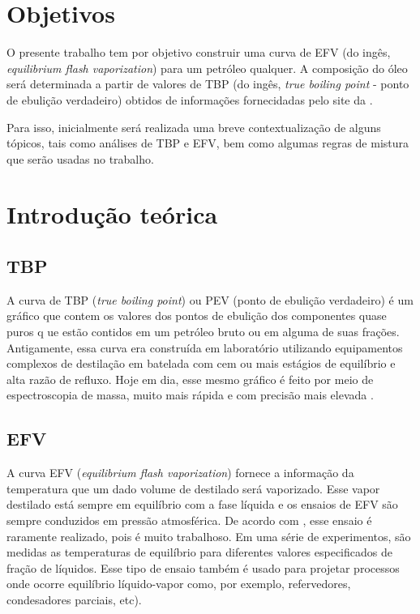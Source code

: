 \section{Objetivos}
O presente trabalho tem por objetivo construir uma curva de EFV (do
ingês, \emph{equilibrium flash vaporization}) para um petróleo qualquer. A
composição do óleo será determinada a partir de valores de TBP (do ingês,
\emph{true boiling point} - ponto de ebulição verdadeiro) obtidos de
informações fornecidadas pelo site da \citeauthor{TOTSA2016}.

Para isso, inicialmente será realizada uma breve contextualização de alguns
tópicos, tais como análises de TBP e EFV, bem como algumas regras de mistura
que serão usadas no trabalho.

\section{Introdução teórica}

\subsection{TBP}
A curva de TBP (\emph{true boiling point}) ou PEV (ponto de ebulição verdadeiro)
é um gráfico que contem os valores dos pontos de ebulição  dos componentes quase puros q
ue estão contidos em um petróleo bruto ou em alguma de suas frações. Antigamente, 
essa curva era construída em laboratório utilizando equipamentos complexos de 
destilação em batelada com cem ou mais estágios de equilíbrio e alta razão de 
refluxo. Hoje em dia, esse mesmo gráfico é feito por meio de espectroscopia de massa, 
muito mais rápida e com precisão mais elevada \cite{Jones2006}.

\subsection{EFV}


A curva EFV (\emph{equilibrium flash vaporization}) fornece a informação da
temperatura que um dado volume de destilado será vaporizado. Esse vapor
destilado está sempre em equilíbrio com a fase líquida e os ensaios de EFV são
sempre conduzidos em pressão atmosférica. De acordo com ,
esse ensaio é raramente realizado, pois é muito trabalhoso. Em uma série de
experimentos, são medidas as temperaturas de equilíbrio para diferentes valores especificados de 
 fração de líquidos. Esse tipo de ensaio também é usado para projetar processos
 onde ocorre equilíbrio líquido-vapor como, por exemplo, refervedores, condesadores
  parciais, etc).
  
